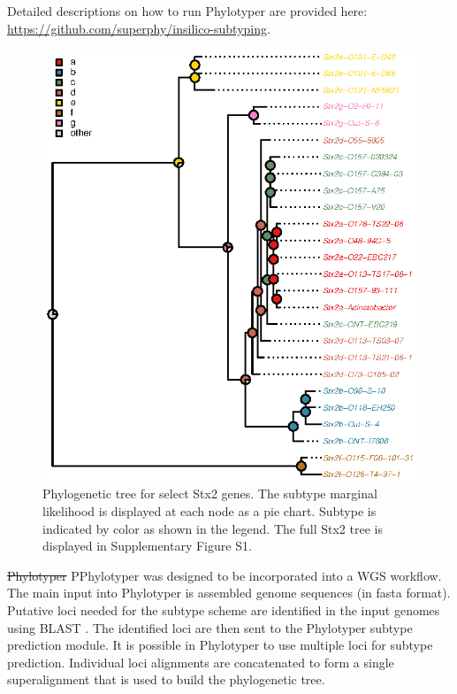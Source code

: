 \documentclass{bioinfo}
\providecommand{\DIFadd}[1]{{\protect\color{red}#1}} %
\providecommand{\DIFdel}[1]{{\protect\color{red}\sout{#1}}}                      %
\providecommand{\DIFaddbegin}{} %
\providecommand{\DIFaddend}{} %
\providecommand{\DIFdelbegin}{} %
\providecommand{\DIFdelend}{} %
\providecommand{\DIFaddFL}[1]{\DIFadd{#1}} %
\providecommand{\DIFaddbeginFL}{} %
\providecommand{\DIFaddendFL}{} %
\begin{document}
\DIFaddbegin \DIFadd{Detailed descriptions on how to run Phylotyper are provided here: }\url{https://github.com/superphy/insilico-subtyping}\DIFadd{.
}

\DIFaddend \begin{figure}[!tpb]%
\centerline{\includegraphics{fig01.eps}}
\caption{Phylogenetic tree for select Stx2 genes. 
The subtype marginal likelihood is displayed at each node as a pie chart. \DIFaddbeginFL \DIFaddFL{Subtype is indicated by color as shown in the legend. }\DIFaddendFL The full Stx2 tree is displayed in Supplementary Figure S1.}\label{fig:01}
\end{figure}

\DIFdelbegin \DIFdel{Phylotyper }\DIFdelend \DIFaddbegin \DIFadd{PPhylotyper }\DIFaddend was designed to be incorporated into a WGS workflow.  
The main input into Phylotyper is assembled genome sequences \DIFaddbegin \DIFadd{(in fasta format)}\DIFaddend .  
Putative loci needed for the subtype scheme are identified in the input genomes using BLAST \citep{Camacho2009}.
The identified loci are then sent to the Phylotyper subtype prediction module.
It is possible in Phylotyper to use multiple loci for subtype prediction.
Individual loci alignments are concatenated to form a single superalignment that is used to build the phylogenetic tree.
\end{document}
